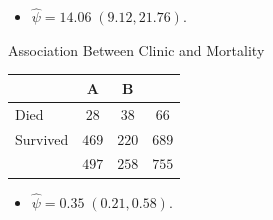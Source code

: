 \documentclass{article}\usepackage[]{graphicx}\usepackage[svgnames]{xcolor}
\begin{document}
\begin{itemize}
    \item $ \hat{\psi}=14.06\;(9.12,21.76) $.
\end{itemize}
\begin{Example}{Association Between Clinic and Mortality}
    \begin{center}
        \begin{NiceTabular}{l|cc|c}
            & A                            & B &                                         \\
            \midrule
            Died & $ 28 $                            & $ 38 $                 & $ 66 $         \\
            Survived   & $ 469 $                            & $ 220 $                 & $ 689 $         \\
            \midrule
            & $ 497 $                    & $ 258 $ & $ 755 $
        \end{NiceTabular}
    \end{center}
\end{Example}
\begin{itemize}
    \item $ \hat{\psi}=0.35\;(0.21,0.58) $.
\end{itemize}
\end{document}
